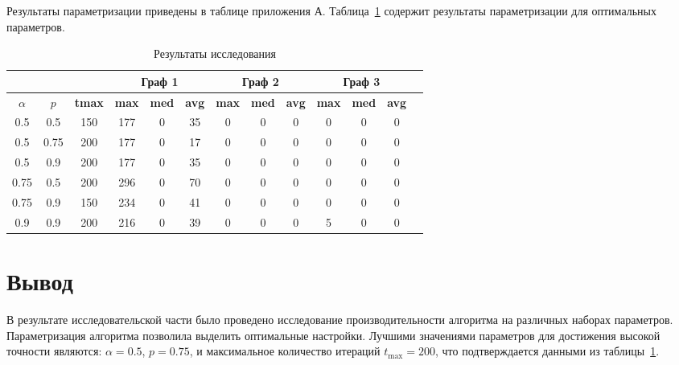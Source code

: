 Результаты параметризации приведены в таблице приложения А. Таблица~\ref{tab:experiment_results} содержит результаты параметризации для оптимальных параметров.

\begin{table}[H]
\centering
\caption{Результаты исследования}
\begin{tabular}{|c|c|c|c|c|c|c|c|c|c|c|c|c|}
\hline
\multicolumn{3}{|c|}{} & \multicolumn{3}{|c|}{Граф 1} & \multicolumn{3}{|c|}{Граф 2} & \multicolumn{3}{|c|}{Граф 3} \\ \hline
\textbf{\boldmath$\alpha$} & \textbf{\boldmath$p$} & \textbf{tmax} & \textbf{max} & \textbf{med} & \textbf{avg} & \textbf{max} & \textbf{med} & \textbf{avg} & \textbf{max} & \textbf{med} & \textbf{avg} \\ \hline
0.5 & 0.5 & 150 & 177 & 0 & 35 & 0 & 0 & 0 & 0 & 0 & 0 \\ \hline
0.5 & 0.75 & 200 & 177 & 0 & 17 & 0 & 0 & 0 & 0 & 0 & 0 \\ \hline
0.5 & 0.9 & 200 & 177 & 0 & 35 & 0 & 0 & 0 & 0 & 0 & 0 \\ \hline
0.75 & 0.5 & 200 & 296 & 0 & 70 & 0 & 0 & 0 & 0 & 0 & 0 \\ \hline
0.75 & 0.9 & 150 & 234 & 0 & 41 & 0 & 0 & 0 & 0 & 0 & 0 \\ \hline
0.9 & 0.9 & 200 & 216 & 0 & 39 & 0 & 0 & 0 & 5 & 0 & 0 \\ \hline
\end{tabular}
\label{tab:experiment_results}
\end{table}



\section*{Вывод}

В результате исследовательской части было проведено исследование производительности алгоритма на различных наборах параметров.
Параметризация алгоритма позволила выделить оптимальные настройки. Лучшими значениями параметров для достижения высокой точности являются: $\alpha = 0.5$, $p = 0.75$, и максимальное количество итераций $t_{\text{max}} = 200$, что подтверждается данными из таблицы~\ref{tab:experiment_results}. 

\clearpage
